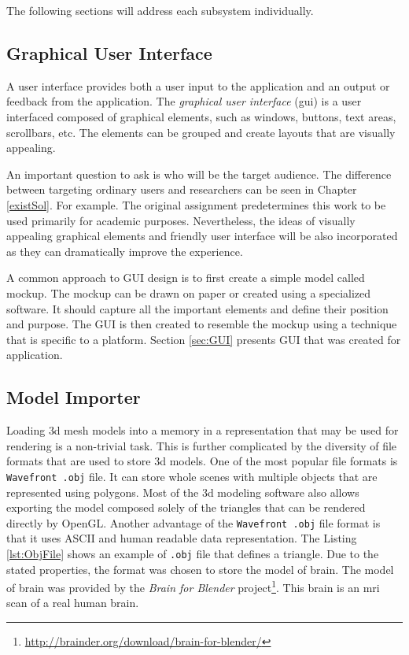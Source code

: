 The following sections will address each subsystem individually.
\subsection{Graphical User Interface}
A user interface provides both a user input to the application and an output or feedback from the application. The \emph{graphical user interface} (\gls{gui}) is a user interfaced composed of graphical elements, such as windows, buttons, text areas, scrollbars, etc. The elements can be grouped and create layouts that are visually appealing. 

An important question to ask is who will be the target audience. The difference between targeting ordinary users and researchers can be seen in Chapter \ref{existSol}. For example. The original assignment predetermines this work to be used primarily for academic purposes. Nevertheless, the ideas of visually appealing graphical elements and friendly user interface will be also incorporated as they can dramatically improve the experience.

A common approach to GUI design is to first create a simple model called mockup. The mockup can be drawn on paper or created using a specialized software. It should capture all the important elements and define their position and purpose. The GUI is then created to resemble the mockup using a technique that is specific to a platform. Section \ref{sec:GUI} presents GUI that was created for application. 

\subsection{Model Importer}
Loading \gls{3d} mesh models into a memory in a representation that may be used for rendering is a non-trivial task. This is further complicated by the diversity of file formats that are used to store \gls{3d} models. One of the most popular file formats is \texttt{Wavefront .obj} file. It can store whole scenes with multiple objects that are represented using polygons. Most of the \gls{3d} modeling software also allows exporting the model composed solely of the triangles that can be rendered directly by OpenGL. Another advantage of the \texttt{Wavefront .obj} file format is that it uses ASCII and human readable data representation. The Listing \ref{lst:ObjFile} shows an example of \texttt{.obj} file that defines a triangle. Due to the stated properties, the format was chosen to store the model of brain. The model of brain was provided by the \emph{Brain for Blender} project\footnote{\url{http://brainder.org/download/brain-for-blender/}}. This brain is an \gls{mri} scan of a real human brain.

